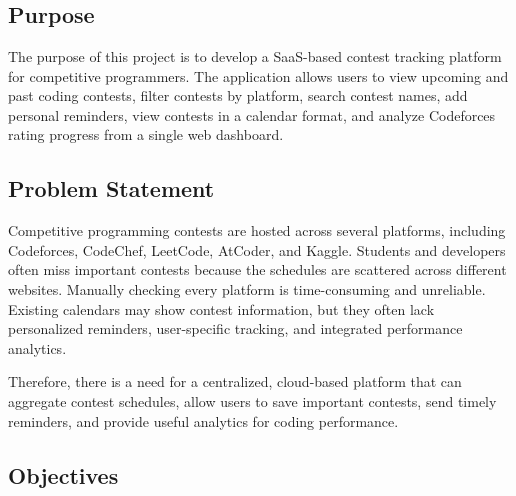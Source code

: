 \documentclass[12pt,a4paper]{report}
\begin{document}
\chapter{}
\begin{normalsize}

\section{Purpose}

The purpose of this project is to develop a SaaS-based contest tracking platform for competitive programmers. The application allows users to view upcoming and past coding contests, filter contests by platform, search contest names, add personal reminders, view contests in a calendar format, and analyze Codeforces rating progress from a single web dashboard.

\section{Problem Statement}

Competitive programming contests are hosted across several platforms, including Codeforces, CodeChef, LeetCode, AtCoder, and Kaggle. Students and developers often miss important contests because the schedules are scattered across different websites. Manually checking every platform is time-consuming and unreliable. Existing calendars may show contest information, but they often lack personalized reminders, user-specific tracking, and integrated performance analytics.

\vspace{0.3cm}

\noindent
Therefore, there is a need for a centralized, cloud-based platform that can aggregate contest schedules, allow users to save important contests, send timely reminders, and provide useful analytics for coding performance.

\section{Objectives}


\end{normalsize}
\end{document}
